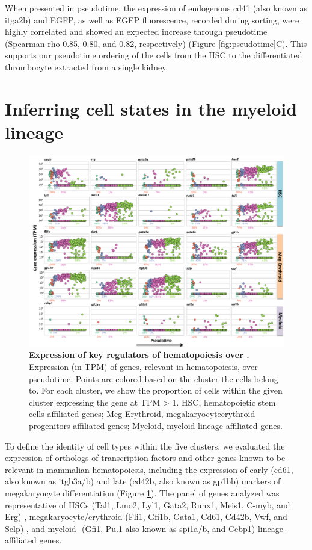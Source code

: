 When presented in pseudotime, the expression of endogenous cd41 (also known as itga2b) and EGFP, as well as EGFP fluorescence, recorded during sorting, were highly correlated and showed an expected increase through pseudotime (Spearman rho 0.85, 0.80, and 0.82, respectively) (Figure \ref{fig:pseudotime}C). This supports our pseudotime ordering of the cells from the HSC to the differentiated thrombocyte extracted from a single kidney.

\section{Inferring cell states in the myeloid lineage}

\begin{figure}
    \centering
    \includegraphics[width=\textwidth]{"Figure3"}
    \caption[Expression of key regulators of hematopoiesis over ]{\textbf{Expression of key regulators of hematopoiesis over .} Expression (in TPM) of genes, relevant in hematopoiesis, over pseudotime. Points are colored based on the cluster the cells belong to. For each cluster, we show the proportion of cells within the given cluster expressing the gene at TPM > 1. HSC, hematopoietic stem cells-affiliated genes; Meg-Erythroid, megakaryocyteerythroid progenitors-affiliated genes; Myeloid, myeloid lineage-affiliated genes.}
    \label{fig:genes}
\end{figure}

To define the identity of cell types within the five clusters, we evaluated the expression of orthologs of transcription factors and other genes known to be relevant in mammalian hematopoiesis, including the expression of early (cd61, also known as itgb3a/b) and late (cd42b, also known as gp1bb) markers of megakaryocyte differentiation (Figure \ref{fig:genes}). The panel of genes analyzed was representative of HSCs (Tal1, Lmo2, Lyl1, Gata2, Runx1, Meis1, C-myb, and Erg)  \cite{Capron2006-mp, Greig2008-ab, Loughran2008-el, Orkin2008-os, Pineault2002-kl}, megakaryocyte/erythroid (Fli1, Gfi1b, Gata1, Cd61, Cd42b, Vwf, and Selp)  \cite{Clay2001-fa, Orkin2008-os, Poirault-Chassac2010-bf, Schick1993-lj}, and myeloid- (Gfi1, Pu.1 also known as spi1a/b, and Cebp1)  \cite{Tenen1997-dr, Zeng2004-dh} lineage-affiliated genes.


